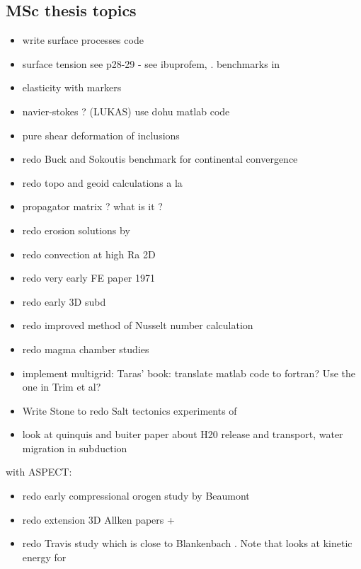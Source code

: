 \subsection{MSc thesis topics}
\begin{itemize} 
\item write surface processes code
\item surface tension see \cite{reddybook2}p28-29 - see ibuprofem, \cite{dett04}. benchmarks in \cite{chcc12} 
\item elasticity with markers
\item navier-stokes ? (LUKAS) use dohu matlab code
\item pure shear deformation of inclusions \cite{trla00}
\item redo Buck and Sokoutis benchmark for continental convergence \cite{buso94}
\item redo topo and geoid calculations a la \cite{king09}
\item propagator matrix ? what is it ? \cite{ribe18} 
\Literature \cite{haoc78,haoc81,riha84,zhon96,como97,mohc98,zhzu00,lezh08,leha08,mofm07,mibb09,fope91,lizh13,bugo94} 
\item redo erosion solutions by \cite{cull60} 
\item redo convection at high Ra 2D \cite{scan85}
\item redo very early FE paper 1971 \cite{stbe71}
\item redo early 3D subd \cite{zhgu96}
\item redo improved method of Nusselt number calculation \cite{hohr87}
\item redo magma chamber studies \cite{cuwi14,gehn18}
\item implement multigrid: Taras' book: translate matlab code to fortran? Use the one in Trim et al?
\item Write Stone to redo Salt tectonics experiments of \cite{dacl94}
\item look at quinquis and buiter paper about H20 release and transport, water migration in subduction
\end{itemize}

with ASPECT:

\begin{itemize}
\item redo early compressional orogen study by Beaumont \cite{bequ94}
\item redo extension 3D Allken papers + \cite{poay84,katl95} 
\item redo Travis study \cite{trab90} which is close to Blankenbach \cite{blbc89}. Note that \cite{maie12} looks at kinetic energy for \cite{trab90} 
\end{itemize}



